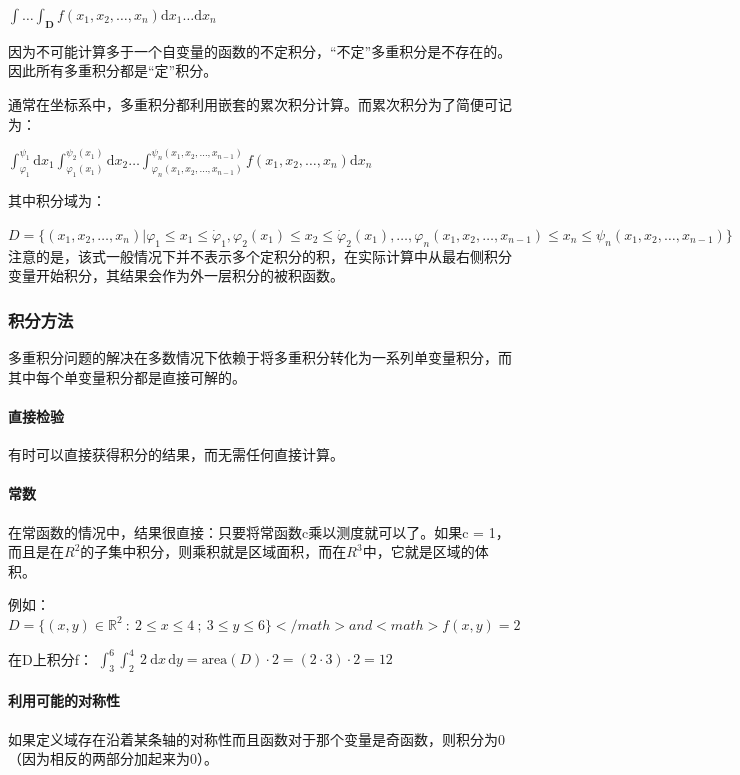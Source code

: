 \documentclass[UTF-8]{ctexart}
\begin{document}
$\int\ldots\int_{\mathbf{D}} f(x_{1},x_{2},\ldots,x_{n}) \mathrm{d}x_{1}\ldots\mathrm{d}x_{n}$

因为不可能计算多于一个自变量的函数的不定积分，“不定”多重积分是不存在的。因此所有多重积分都是“定”积分。

通常在坐标系中，多重积分都利用嵌套的累次积分计算。而累次积分为了简便可记为：

$\int_{\varphi_{1}}^{\psi_{1}}\mathrm{d}x_{1}\int_{\varphi_{1}(x_{1})}^{\psi_{2}(x_{1})}\mathrm{d}x_{2}\ldots\int_{\varphi_{n}(x_{1},x_{2},\ldots,x_{n-1})}^{\psi_{n}(x_{1},x_{2},\ldots,x_{n-1})}f(x_{1},x_{2},\ldots,x_{n})\mathrm{d}x_{n}$

其中积分域为：

$D=\{(x_1,x_2,\ldots,x_n)|\varphi_1\leq
x_1\leq\dot{\varphi}_1,\varphi_2(x_1)\leq
x_2\leq\dot{\varphi}_2(x_1),\ldots,\varphi_n(x_1,x_2,\ldots,x_{n-1})\leq
x_n\leq\psi_n(x_1,x_2,\ldots,x_{n-1})\}$
注意的是，该式一般情况下并不表示多个定积分的积，在实际计算中从最右侧积分变量开始积分，其结果会作为外一层积分的被积函数。

\subsubsection{积分方法}
多重积分问题的解决在多数情况下依赖于将多重积分转化为一系列单变量积分，而其中每个单变量积分都是直接可解的。

\paragraph{直接检验}
有时可以直接获得积分的结果，而无需任何直接计算。

\paragraph{常数}
在常函数的情况中，结果很直接：只要将常函数c乘以测度就可以了。如果c = 1，而且是在$R^2$的子集中积分，则乘积就是区域面积，而在$R^3$中，它就是区域的体积。

例如：
$D = \{ (x,y) \in \mathbb{R}^2 \ : \ 2 \le x \le 4 \ ; \ 3 \le y \le 6 \}</math> and <math>f(x,y) = 2$

在D上积分f：
$\int_3^6 \int_2^4 \ 2 \ \mathrm{d}x\, \mathrm{d}y = \mbox{area}(D) \cdot 2 = (2 \cdot 3) \cdot 2 = 12$
\paragraph{利用可能的对称性}
如果定义域存在沿着某条轴的对称性而且函数对于那个变量是奇函数，则积分为0（因为相反的两部分加起来为0）。
\end{document}
